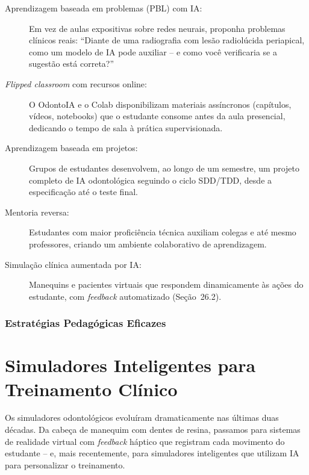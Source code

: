 \begin{description}
  \item[Aprendizagem baseada em problemas (PBL) com IA:] Em vez de aulas
    expositivas sobre redes neurais, proponha problemas clínicos reais:
    ``Diante de uma radiografia com lesão radiolúcida periapical, como um modelo
    de IA pode auxiliar -- e como você verificaria se a sugestão está correta?''

  \item[\textit{Flipped classroom} com recursos online:] O OdontoIA e o
    Colab disponibilizam materiais assíncronos (capítulos, vídeos, notebooks)
    que o estudante consome antes da aula presencial, dedicando o tempo de sala
    à prática supervisionada.

  \item[Aprendizagem baseada em projetos:] Grupos de estudantes desenvolvem,
    ao longo de um semestre, um projeto completo de IA odontológica seguindo o
    ciclo SDD/TDD, desde a especificação até o teste final.

  \item[Mentoria reversa:] Estudantes com maior proficiência técnica auxiliam
    colegas e até mesmo professores, criando um ambiente colaborativo de
    aprendizagem.

  \item[Simulação clínica aumentada por IA:] Manequins e pacientes virtuais que
    respondem dinamicamente às ações do estudante, com \textit{feedback}
    automatizado (Seção~26.2).
\end{description}

\subsubsection{Estratégias Pedagógicas Eficazes}

\section{Simuladores Inteligentes para Treinamento Clínico}
\label{sec:simuladores}

\nivelquatro

Os simuladores odontológicos evoluíram dramaticamente nas últimas duas décadas.
Da cabeça de manequim com dentes de resina, passamos para sistemas de realidade
virtual com \textit{feedback} háptico que registram cada movimento do estudante
-- e, mais recentemente, para simuladores inteligentes que utilizam IA para
personalizar o treinamento.

